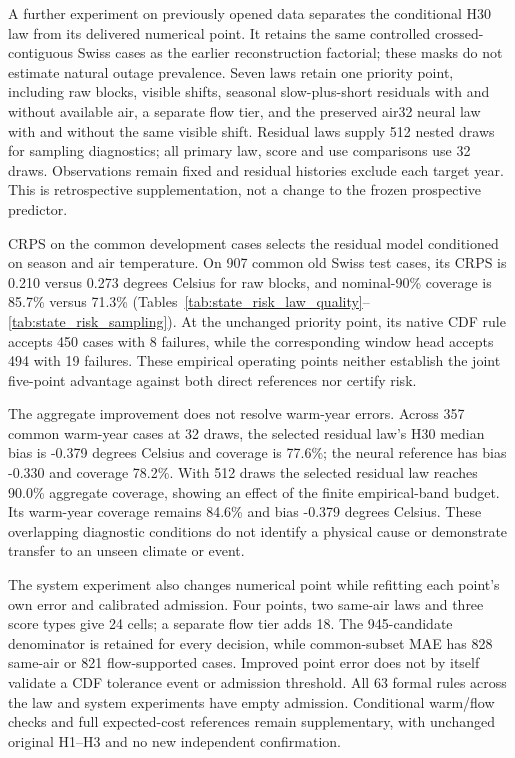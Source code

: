 A further experiment on previously opened data separates the conditional H30 law from its delivered numerical point. It retains the same controlled crossed-contiguous Swiss cases as the earlier reconstruction factorial; these masks do not estimate natural outage prevalence. Seven laws retain one priority point, including raw blocks, visible shifts, seasonal slow-plus-short residuals with and without available air, a separate flow tier, and the preserved air32 neural law with and without the same visible shift. Residual laws supply 512 nested draws for sampling diagnostics; all primary law, score and use comparisons use 32 draws. Observations remain fixed and residual histories exclude each target year. This is retrospective supplementation, not a change to the frozen prospective predictor.

CRPS on the common development cases selects the residual model conditioned on season and air temperature. On 907 common old Swiss test cases, its CRPS is 0.210 versus 0.273 degrees Celsius for raw blocks, and nominal-90\% coverage is 85.7\% versus 71.3\% (Tables~\ref{tab:state_risk_law_quality}--\ref{tab:state_risk_sampling}). At the unchanged priority point, its native CDF rule accepts 450 cases with 8 failures, while the corresponding window head accepts 494 with 19 failures. These empirical operating points neither establish the joint five-point advantage against both direct references nor certify risk.

The aggregate improvement does not resolve warm-year errors. Across 357 common warm-year cases at 32 draws, the selected residual law's H30 median bias is -0.379 degrees Celsius and coverage is 77.6\%; the neural reference has bias -0.330 and coverage 78.2\%. With 512 draws the selected residual law reaches 90.0\% aggregate coverage, showing an effect of the finite empirical-band budget. Its warm-year coverage remains 84.6\% and bias -0.379 degrees Celsius. These overlapping diagnostic conditions do not identify a physical cause or demonstrate transfer to an unseen climate or event.

The system experiment also changes numerical point while refitting each point's own error and calibrated admission. Four points, two same-air laws and three score types give 24 cells; a separate flow tier adds 18. The 945-candidate denominator is retained for every decision, while common-subset MAE has 828 same-air or 821 flow-supported cases. Improved point error does not by itself validate a CDF tolerance event or admission threshold. All 63 formal rules across the law and system experiments have empty admission. Conditional warm/flow checks and full expected-cost references remain supplementary, with unchanged original H1--H3 and no new independent confirmation.
